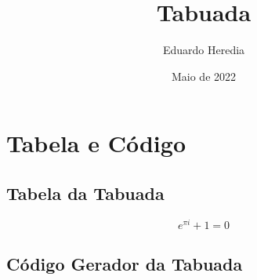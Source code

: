 \documentclass[
	article,
	11pt,
	oneside,
	a4paper,
	brazil
]{abntex2}
\title{Tabuada}
\author{Eduardo Heredia}
\date{Maio de 2022}
\begin{document}
    \section{Tabela e Código}

        \lipsum[2-4]

        \subsection{Tabela da Tabuada}

            $$
                e^{\pi i} + 1 = 0
            $$

            

        \newpage
        \subsection{Código Gerador da Tabuada}

            
\end{document}
